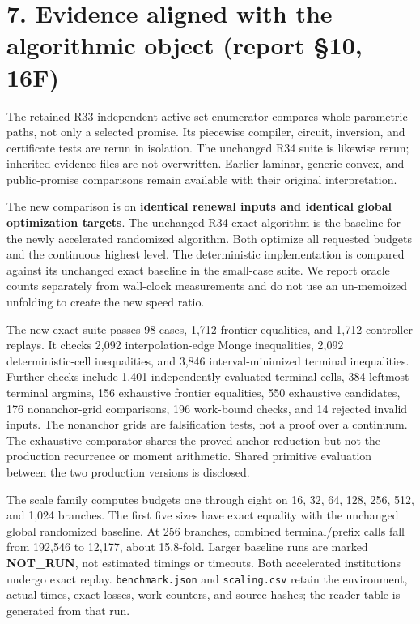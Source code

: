 \documentclass[11pt,letterpaper]{article}
\begin{document}
\section*{7. Evidence aligned with the algorithmic object (report §10, 16F)}

The retained R33 independent active-set enumerator compares whole parametric paths, not only a selected promise. Its piecewise compiler, circuit, inversion, and certificate tests are rerun in isolation. The unchanged R34 suite is likewise rerun; inherited evidence files are not overwritten. Earlier laminar, generic convex, and public-promise comparisons remain available with their original interpretation.


The new comparison is on \textbf{identical renewal inputs and identical global optimization targets}. The unchanged R34 exact algorithm is the baseline for the newly accelerated randomized algorithm. Both optimize all requested budgets and the continuous highest level. The deterministic implementation is compared against its unchanged exact baseline in the small-case suite. We report oracle counts separately from wall-clock measurements and do not use an un-memoized unfolding to create the new speed ratio.


The new exact suite passes 98 cases, 1,712 frontier equalities, and 1,712 controller replays. It checks 2,092 interpolation-edge Monge inequalities, 2,092 deterministic-cell inequalities, and 3,846 interval-minimized terminal inequalities. Further checks include 1,401 independently evaluated terminal cells, 384 leftmost terminal argmins, 156 exhaustive frontier equalities, 550 exhaustive candidates, 176 nonanchor-grid comparisons, 196 work-bound checks, and 14 rejected invalid inputs. The nonanchor grids are falsification tests, not a proof over a continuum. The exhaustive comparator shares the proved anchor reduction but not the production recurrence or moment arithmetic. Shared primitive evaluation between the two production versions is disclosed.


The scale family computes budgets one through eight on 16, 32, 64, 128, 256, 512, and 1,024 branches. The first five sizes have exact equality with the unchanged global randomized baseline. At 256 branches, combined terminal/prefix calls fall from 192,546 to 12,177, about 15.8-fold. Larger baseline runs are marked \textbf{NOT\_RUN}, not estimated timings or timeouts. Both accelerated institutions undergo exact replay. \nolinkurl{benchmark.json} and \nolinkurl{scaling.csv} retain the environment, actual times, exact losses, work counters, and source hashes; the reader table is generated from that run.
\end{document}
